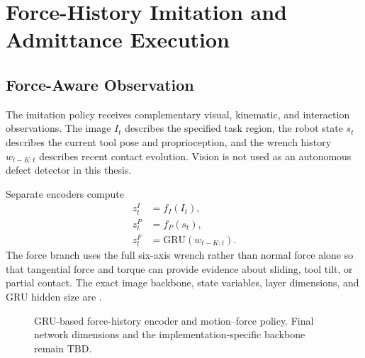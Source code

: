 \chapter{Force-History Imitation and Admittance Execution}
\label{chap:force_il}

\section{Force-Aware Observation}
The imitation policy receives complementary visual, kinematic, and interaction observations. The image \(I_t\) describes the specified task region, the robot state \(s_t\) describes the current tool pose and proprioception, and the wrench history \(w_{t-K:t}\) describes recent contact evolution. Vision is not used as an autonomous defect detector in this thesis.

Separate encoders compute
\begin{align}
  z_t^I &= f_I(I_t),\\
  z_t^P &= f_P(s_t),\\
  z_t^F &= \mathrm{GRU}(w_{t-K:t}).
  \label{eq:policy_encoders}
\end{align}
The force branch uses the full six-axis wrench rather than normal force alone so that tangential force and torque can provide evidence about sliding, tool tilt, or partial contact. The exact image backbone, state variables, layer dimensions, and GRU hidden size are .

\begin{figure}[t]
  \centering
  \caption{GRU-based force-history encoder and motion--force policy. Final network dimensions and the implementation-specific backbone remain TBD.}
  \label{fig:force_history_policy}
\end{figure}


